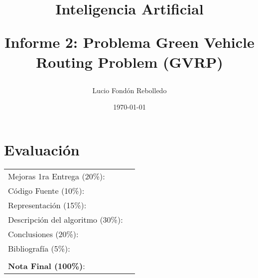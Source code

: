 \documentclass[letter, 10pt]{article}
\begin{document}
\title{Inteligencia Artificial \\ \begin{Large}Informe 2: Problema Green Vehicle Routing
Problem (GVRP)\end{Large}}
\author{Lucio Fondón Rebolledo}
\date{\today}
\maketitle


\section*{Evaluaci\'on}

\begin{tabular}{ll}
Mejoras 1ra Entrega (20\%): &  \underline{\hspace{2cm}}\\
C\'odigo Fuente (10\%): &  \underline{\hspace{2cm}}\\
Representaci\'on (15\%):  & \underline{\hspace{2cm}} \\
Descripci\'on del algoritmo (30\%):  & \underline{\hspace{2cm}} \\
Conclusiones (20\%): &  \underline{\hspace{2cm}}\\
Bibliograf\'ia (5\%): & \underline{\hspace{2cm}}\\
 &  \\
\textbf{Nota Final (100\%)}:   & \underline{\hspace{2cm}}
\end{tabular}

\vspace{2cm}
\end{document}
